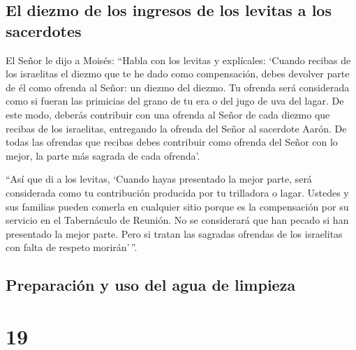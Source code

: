 \hypertarget{el-diezmo-de-los-ingresos-de-los-levitas-a-los-sacerdotes}{%
\subsection{El diezmo de los ingresos de los levitas a los
sacerdotes}\label{el-diezmo-de-los-ingresos-de-los-levitas-a-los-sacerdotes}}

 El Señor le dijo a Moisés:  ``Habla con
los levitas y explícales: `Cuando recibas de los israelitas el diezmo
que te he dado como compensación, debes devolver parte de él como
ofrenda al Señor: un diezmo del diezmo.  Tu ofrenda será
considerada como si fueran las primicias del grano de tu era o del jugo
de uva del lagar.  De este modo, deberás contribuir con
una ofrenda al Señor de cada diezmo que recibas de los israelitas,
entregando la ofrenda del Señor al sacerdote Aarón.  De
todas las ofrendas que recibas debes contribuir como ofrenda del Señor
con lo mejor, la parte más sagrada de cada ofrenda'.

 ``Así que di a los levitas, `Cuando hayas presentado la
mejor parte, será considerada como tu contribución producida por tu
trilladora o lagar.  Ustedes y sus familias pueden
comerla en cualquier sitio porque es la compensación por su servicio en
el Tabernáculo de Reunión.  No se considerará que han
pecado si han presentado la mejor parte. Pero si tratan las sagradas
ofrendas de los israelitas con falta de respeto morirán'\,''.

\hypertarget{preparaciuxf3n-y-uso-del-agua-de-limpieza}{%
\subsection{Preparación y uso del agua de
limpieza}\label{preparaciuxf3n-y-uso-del-agua-de-limpieza}}

\hypertarget{section-18}{%
\section{19}\label{section-18}}

